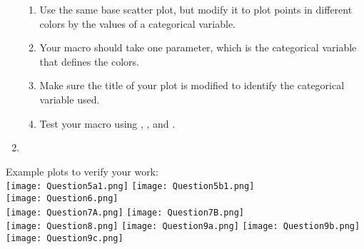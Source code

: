 \begin{enumerate}
\begin{enumerate}
    \item Use the same base scatter plot, but modify it to plot points in different colors by the values of a categorical variable.
    \item Your macro should take one parameter, which is the categorical variable that defines the colors.
    \item Make sure the title of your plot is modified to identify the categorical variable used.
    \item Test your macro using , , and .
\end{enumerate}
\item[]
\end{enumerate}
	
\newpage
Example plots to verify your work: \\
\vskip10pt
\texttt{[image: Question5a1.png]}
\hspace{0.1in}
\texttt{[image: Question5b1.png]}\\
\vskip10pt
\texttt{[image: Question6.png]}\\
\vskip10pt
\texttt{[image: Question7A.png]}
\hspace{0.1in}
\texttt{[image: Question7B.png]}\\
\vskip10pt
\texttt{[image: Question8.png]}
\hspace{0.1in}
\texttt{[image: Question9a.png]}
\vskip10pt
\texttt{[image: Question9b.png]}
\hspace{0.1in}
\texttt{[image: Question9c.png]}

